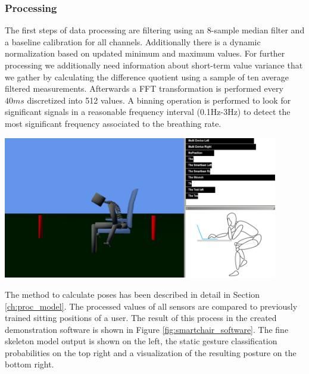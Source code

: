 \subsubsection{Processing}
The first steps of data processing are filtering using an 8-sample median filter and a baseline calibration for all channels. Additionally there is a dynamic normalization based on updated minimum and maximum values. For further processing we additionally need information about short-term value variance that we gather by calculating the difference quotient using a sample of ten average filtered measurements. Afterwards a FFT transformation is performed every $40ms$ discretized into 512 values. A binning operation is performed to look for significant signals in a reasonable frequency interval (0.1Hz-3Hz) to detect the most significant frequency associated to the breathing rate. 

\begin{minipage}{\linewidth}
\centering
\includegraphics[width=0.9\textwidth]{images/smartchair_software}
\label{fig:smartchair_posture_software}
\end{minipage}

The method to calculate poses has been described in detail in Section \ref{ch:proc_model}. The processed values of all sensors are compared to previously trained sitting positions of a user. The result of this process in the created demonstration software is shown in Figure \ref{fig:smartchair_software}. The fine skeleton model output is shown on the left, the static gesture classification probabilities on the top right and a visualization of the resulting posture on the bottom right.

